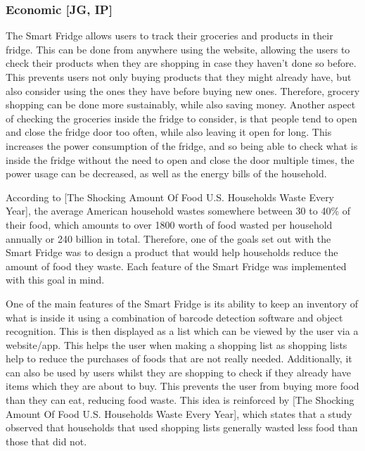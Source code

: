 \subsubsection{Economic [JG, IP]}

The Smart Fridge allows users to track their groceries and products in their fridge.
This can be done from anywhere using the website, allowing the users to check their products when they are shopping in case they haven't done so before.
This prevents users not only buying products that they might already have, but also consider using the ones they have before buying new ones.
Therefore, grocery shopping can be done more sustainably, while also saving money.
Another aspect of checking the groceries inside the fridge to consider, is that people tend to open and close the fridge door too often, while also leaving it open for long.
This increases the power consumption of the fridge, and so being able to check what is inside the fridge without the need to open and close the door multiple times, the power usage can be decreased, as well as the energy bills of the household.  

According to [The Shocking Amount Of Food U.S.
Households Waste Every Year], the average American household wastes somewhere between 30 to 40\% of their food, which amounts to over 1800 worth of food wasted per household annually or 240 billion in total.
Therefore, one of the goals set out with the Smart Fridge was to design a product that would help households reduce the amount of food they waste.
Each feature of the Smart Fridge was implemented with this goal in mind.

One of the main features of the Smart Fridge is its ability to keep an inventory of what is inside it using a combination of barcode detection software and object recognition.
This is then displayed as a list which can be viewed by the user via a website/app.
This helps the user when making a shopping list as shopping lists help to reduce the purchases of foods that are not really needed.
Additionally, it can also be used by users whilst they are shopping to check if they already have items which they are about to buy.
This prevents the user from buying more food than they can eat, reducing food waste.
This idea is reinforced by [The Shocking Amount Of Food U.S.
Households Waste Every Year], which states that a study observed that households that used shopping lists generally wasted less food than those that did not.

